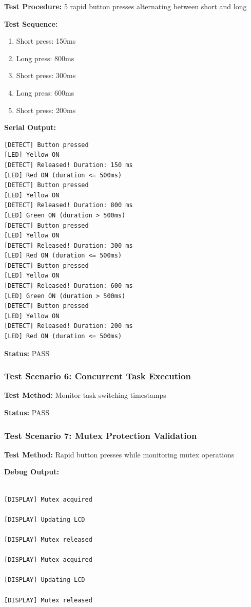 \documentclass[12pt]{article}
\begin{document}
\textbf{Test Procedure:} 5 rapid button presses alternating between short and long

\textbf{Test Sequence:}
\begin{enumerate}
    \item Short press: 150ms
    \item Long press: 800ms
    \item Short press: 300ms
    \item Long press: 600ms
    \item Short press: 200ms
\end{enumerate}

\textbf{Serial Output:}
\begin{verbatim}
[DETECT] Button pressed
[LED] Yellow ON
[DETECT] Released! Duration: 150 ms
[LED] Red ON (duration <= 500ms)
[DETECT] Button pressed
[LED] Yellow ON
[DETECT] Released! Duration: 800 ms
[LED] Green ON (duration > 500ms)
[DETECT] Button pressed
[LED] Yellow ON
[DETECT] Released! Duration: 300 ms
[LED] Red ON (duration <= 500ms)
[DETECT] Button pressed
[LED] Yellow ON
[DETECT] Released! Duration: 600 ms
[LED] Green ON (duration > 500ms)
[DETECT] Button pressed
[LED] Yellow ON
[DETECT] Released! Duration: 200 ms
[LED] Red ON (duration <= 500ms)
\end{verbatim}

\textbf{Status:} PASS

\subsubsection*{Test Scenario 6: Concurrent Task Execution}



\textbf{Test Method:} Monitor task switching timestamps



\textbf{Status:} PASS



\subsubsection*{Test Scenario 7: Mutex Protection Validation}



\textbf{Test Method:} Rapid button presses while monitoring mutex operations



\textbf{Debug Output:}

\begin{verbatim}

[DISPLAY] Mutex acquired

[DISPLAY] Updating LCD

[DISPLAY] Mutex released

[DISPLAY] Mutex acquired

[DISPLAY] Updating LCD

[DISPLAY] Mutex released

\end{verbatim}
\end{document}
